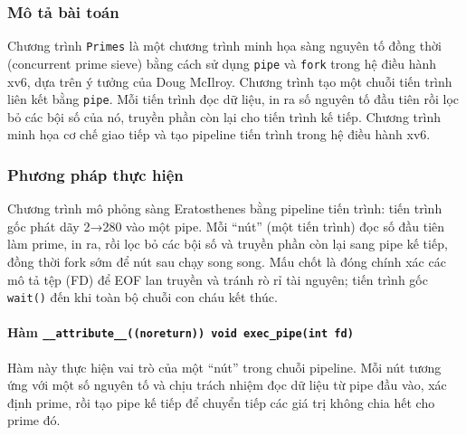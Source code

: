\subsubsection {Mô tả bài toán}
Chương trình \texttt{Primes} là một chương trình minh họa sàng nguyên tố đồng thời (concurrent prime sieve) bằng cách sử dụng \texttt{pipe} và \texttt{fork} trong hệ điều hành xv6, dựa trên ý tưởng của Doug McIlroy. 
Chương trình tạo một chuỗi tiến trình liên kết bằng \texttt{pipe}. Mỗi tiến trình đọc dữ liệu, in ra số nguyên tố đầu tiên rồi lọc bỏ các bội số của nó, truyền phần còn lại cho tiến trình kế tiếp. 
Chương trình minh họa cơ chế giao tiếp và tạo pipeline tiến trình trong hệ điều hành xv6.

\subsubsection{Phương pháp thực hiện}
Chương trình mô phỏng sàng Eratosthenes bằng pipeline tiến trình: tiến trình gốc phát dãy 2→280 vào một pipe. Mỗi “nút” (một tiến trình) đọc số đầu tiên làm prime, in ra, rồi lọc bỏ các bội số và truyền phần còn lại sang pipe kế tiếp, đồng thời fork sớm để nút sau chạy song song. 
Mấu chốt là đóng chính xác các mô tả tệp (FD) để EOF lan truyền và tránh rò rỉ tài nguyên; tiến trình gốc \texttt{wait()} đến khi toàn bộ chuỗi con cháu kết thúc. 

\paragraph {Hàm \lstinline|__attribute__((noreturn)) void exec_pipe(int fd)|}
Hàm này thực hiện vai trò của một “nút” trong chuỗi pipeline. Mỗi nút tương ứng với một số nguyên tố và chịu trách nhiệm đọc dữ liệu từ pipe đầu vào, xác định prime, rồi tạo pipe kế tiếp để chuyển tiếp các giá trị không chia hết cho prime đó.


